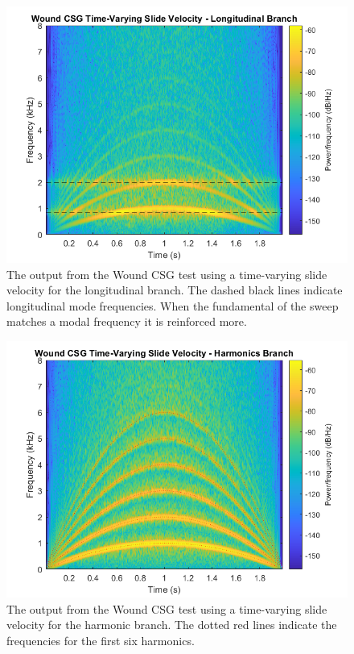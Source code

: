 \documentclass[../main.tex]{subfiles}
\begin{document}
\begin{figure}[hb]
    \centering
    \includegraphics[scale=.65]{./images/plots/CSG_Wound_TV_Long.png}
    \caption{The output from the Wound CSG test using a time-varying slide velocity for the longitudinal branch. The dashed black lines indicate longitudinal mode frequencies. When the fundamental of the sweep matches a modal frequency it is reinforced more.}
    \label{fig:CSGWoundTVLong}
\end{figure}

\begin{figure}[t]
    \centering
    \includegraphics[scale=.60]{./images/plots/CSG_Wound_TV_Harm.png}
    \caption{The output from the Wound CSG test using a time-varying slide velocity for the harmonic branch. The dotted red lines indicate the frequencies for the first six harmonics.}
    \label{fig:CSGWoundTVHarm}
\end{figure}
\end{document}
